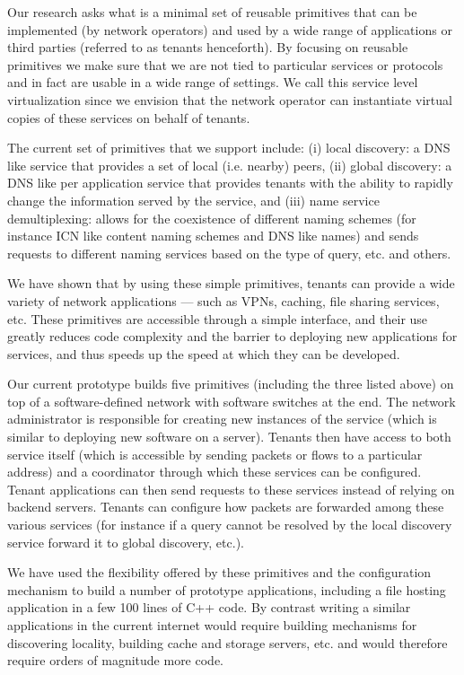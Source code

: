 \documentclass[letterpaper]{article}
\begin{document}
Our research asks what is a minimal set of reusable primitives that can be implemented (by network operators) and used
by a wide range of applications or third parties (referred to as tenants henceforth). By focusing on reusable primitives
we make sure that we are not tied to particular services or protocols and in fact are usable in a wide range of
settings. We call this service level virtualization since we envision that the network operator can instantiate virtual
copies of these services on behalf of tenants.

The current set of primitives that we support include: (i) local discovery: a DNS like service that provides a
set of local (i.e. nearby) peers, (ii) global discovery: a DNS like per application service that provides
tenants with the ability to rapidly change the information served by the service, and (iii) name service
demultiplexing: allows for the coexistence of different naming schemes (for instance ICN like content naming
schemes and DNS like names) and sends requests to different naming services based on the type of query, etc.
and others.

We have shown that by using these simple primitives, tenants can provide a wide variety of network applications --- such as
VPNs, caching, file sharing services, etc. These primitives are accessible through a simple interface, and their use
greatly reduces code complexity and the barrier to deploying new applications for services, and thus speeds up the speed
at which they can be developed.

Our current prototype builds five primitives (including the three listed above) on top of a software-defined network
with software switches at the end. The network administrator is responsible for creating new instances of the service
(which is similar to deploying new software on a server). Tenants then have access to both service itself (which is
accessible by sending packets or flows to a particular address) and a coordinator through which these services can be
configured. Tenant applications can then send requests to these services instead of relying on backend servers. Tenants
can configure how packets are forwarded among these various services (for instance if a query cannot be resolved by the
local discovery service forward it to global discovery, etc.). 

We have used the flexibility offered by these primitives and the configuration mechanism to build a number of prototype
applications, including a file hosting application in a few 100 lines of C++ code. By contrast writing a similar
applications in the current internet would require building mechanisms for discovering locality, building cache and
storage servers, etc. and would therefore require orders of magnitude more code.  
\end{document}
